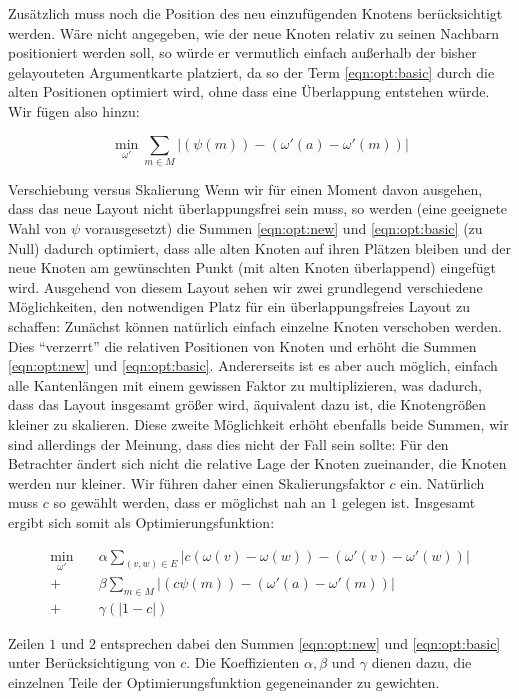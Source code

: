 Zusätzlich muss noch die Position des neu einzufügenden Knotens berücksichtigt werden. Wäre nicht angegeben, wie der neue Knoten relativ zu seinen Nachbarn positioniert werden soll, so würde er vermutlich einfach außerhalb der bisher gelayouteten Argumentkarte platziert, da so der Term \ref{eqn:opt:basic} durch die alten Positionen optimiert wird, ohne dass eine Überlappung entstehen würde. Wir fügen also hinzu:

\begin{equation}
  \label{eqn:opt:new}
  \min_{\omega'} \sum \limits_{m \in M} {|(\psi(m)) - (\omega'(a) - \omega'(m))|}
\end{equation}

\begin{paragraph}{Verschiebung versus Skalierung}
  \label{par:scale}
  Wenn wir für einen Moment davon ausgehen, dass das neue Layout nicht überlappungsfrei sein muss, so werden (eine geeignete Wahl von $\psi$ vorausgesetzt) die Summen \ref{eqn:opt:new} und \ref{eqn:opt:basic} (zu Null) dadurch optimiert, dass alle alten Knoten auf ihren Plätzen bleiben und der neue Knoten am gewünschten Punkt (mit alten Knoten überlappend) eingefügt wird. Ausgehend von diesem Layout sehen wir zwei grundlegend verschiedene Möglichkeiten, den notwendigen Platz für ein überlappungsfreies Layout zu schaffen: Zunächst können natürlich einfach einzelne Knoten verschoben werden. Dies "`verzerrt"' die relativen Positionen von Knoten und erhöht die Summen \ref{eqn:opt:new} und \ref{eqn:opt:basic}. Andererseits ist es aber auch möglich, einfach alle Kantenlängen mit einem gewissen Faktor zu multiplizieren, was dadurch, dass das Layout insgesamt größer wird, äquivalent dazu ist, die Knotengrößen kleiner zu skalieren. Diese zweite Möglichkeit erhöht ebenfalls beide Summen, wir sind allerdings der Meinung, dass dies nicht der Fall sein sollte: Für den Betrachter ändert sich nicht die relative Lage der Knoten zueinander, die Knoten werden nur kleiner. Wir führen daher einen Skalierungsfaktor $c$ ein. Natürlich muss $c$ so gewählt werden, dass er möglichst nah an $1$ gelegen ist. Insgesamt ergibt sich somit als Optimierungsfunktion:
\end{paragraph}

\begin{align}
  \label{eqn:opt:complete}
 \min_{\omega'} \quad & \alpha \sum \limits_{(v,w) \in E} {|c(\omega(v) - \omega(w)) - (\omega'(v) - \omega'(w))|} \nonumber \\
  + & \beta \sum \limits_{m \in M} {|(c\psi(m)) - (\omega'(a) - \omega'(m))|} \nonumber \\
  + & \gamma (|1 - c|)
\end{align}

Zeilen $1$ und $2$ entsprechen dabei den Summen \ref{eqn:opt:new} und \ref{eqn:opt:basic} unter Berücksichtigung von $c$. Die Koeffizienten $\alpha, \beta$ und $\gamma$ dienen dazu, die einzelnen Teile der Optimierungsfunktion gegeneinander zu gewichten.
